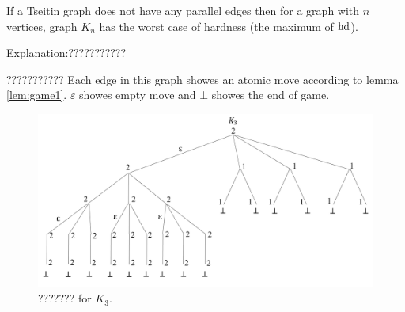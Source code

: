\documentclass[12pt]{book}
\begin{document}
\begin{conj}\label{con:hd_game2}
     If a Tseitin graph does not have any parallel edges then for a graph with $n$ vertices, graph $K_n$ has the worst case 
	 of hardness (the maximum of $\operatorname{hd}$).
	 
	 Explanation:???????????
\end{conj}

\begin{examp}\label{exp:gg1}
      ???????????
	  Each edge in this graph showes an atomic move according to lemma \ref{lem:game1}. $\varepsilon $ showes empty move and $\bot$ 
	  showes the end of game.
	  \begin{figure}
      \begin{center}
      \includegraphics[scale =0.6]{gg1.png}
      \caption{??????? for $K_3$.}
	  \label{fig:gg1}
      \end{center}
      \end{figure}

\end{examp}
\end{document}
